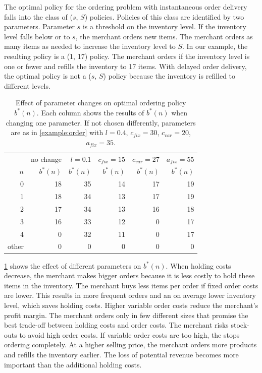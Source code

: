 The optimal policy for the ordering problem with instantaneous order delivery falls into the class of ($s$, $S$) policies.
Policies of this class are identified by two parameters.
Parameter $s$ is a threshold on the inventory level.
If the inventory level falls below or to $s$, the merchant orders new items.
The merchant orders as many items as needed to increase the inventory level to $S$.
In our example, the resulting policy is a (1, 17) policy.
The merchant orders if the inventory level is one or fewer and refills the inventory to 17 items.
With delayed order delivery, the optimal policy is not a ($s$, $S$) policy because the inventory is refilled to different levels.

\begin{table}
	\centering
	\begin{tabular}{rrrrrr}
		\toprule
		& no change & $l= 0.1$ & $c_{fix} = 15$ & $c_{var} = 27$ & $a_{fix} = 55$ \\
		$n$ & $b^*(n)$ & $b^*(n)$ & $b^*(n)$ & $b^*(n)$ & $b^*(n)$ \\
		\midrule
		0 & 18 & 35 & 14 & 17 & 19\\
		1 & 18 & 34 & 13 & 17 & 19\\
		2 & 17 & 34 & 13 & 16 & 18\\
		3 & 16 & 33 & 12 &  0 & 17\\
		4 &  0 & 32 & 11 &  0 & 17\\
		other & 0 & 0 & 0 & 0 &  0\\
		\bottomrule
	\end{tabular}
	\caption[Effect of Parameter Changes on Optimal Ordering Policy]{Effect of parameter changes on optimal ordering policy $b^*(n)$.
	Each column shows the results of $b^*(n)$ when changing one parameter.
	If not chosen differently, parameters are as in \cref{example:order} with $l=0.4$, $c_{fix}=30$, $c_{var}=20$, $a_{fix}=35$.}
	\label{table:order_policy_parameter}
\end{table}


\cref{table:order_policy_parameter} shows the effect of different parameters on $b^*(n)$.
When holding costs decrease, the merchant makes bigger orders because it is less costly to hold these items in the inventory.
The merchant buys less items per order if fixed order costs are lower.
This results in more frequent orders and an on average lower inventory level, which saves holding costs.
Higher variable order costs reduce the merchant's profit margin.
The merchant orders only in few different sizes that promise the best trade-off between holding costs and order costs.
The merchant risks stock-outs to avoid high order costs. 
If variable order costs are too high, the stops ordering completely.
At a higher selling price, the merchant orders more products and refills the inventory earlier.
The loss of potential revenue becomes more important than the additional holding costs.

